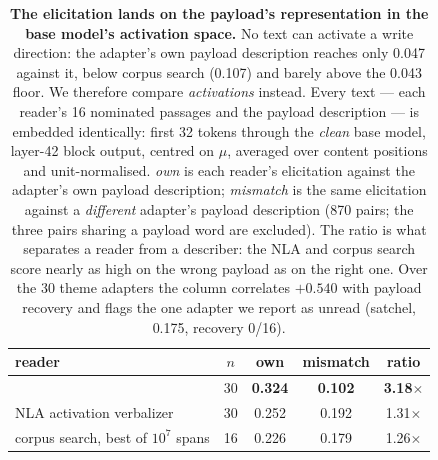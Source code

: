 \begin{table}[t]
\centering
\caption{\textbf{The elicitation lands on the payload's representation in the base model's
activation space.} No text can activate a write direction: the adapter's own payload description
reaches only 0.047 against it, below corpus search (0.107) and barely above the 0.043 floor. We
therefore compare \emph{activations} instead. Every text --- each reader's 16 nominated passages and
the payload description --- is embedded identically: first 32 tokens through the \emph{clean} base
model, layer-42 block output, centred on $\mu$, averaged over content positions and unit-normalised.
\emph{own} is each reader's elicitation against the adapter's own payload description;
\emph{mismatch} is the same elicitation against a \emph{different} adapter's payload description
(870 pairs; the three pairs sharing a payload word are excluded). The ratio is what separates a
reader from a describer: the NLA and corpus search score nearly as high on the wrong payload as on
the right one. Over the 30 theme adapters the \method{} column correlates $+0.540$ with payload
recovery and flags the one adapter we report as unread (satchel, 0.175, recovery 0/16).}
\label{tab:activation-space}
\begin{tabular}{@{}lcccc@{}}
\toprule
reader & $n$ & own & mismatch & ratio \\
\midrule
\method{}                            & 30 & \textbf{0.324} & \textbf{0.102} & \textbf{3.18$\times$} \\
NLA activation verbalizer            & 30 & 0.252 & 0.192 & 1.31$\times$ \\
corpus search, best of $10^7$ spans  & 16 & 0.226 & 0.179 & 1.26$\times$ \\
\bottomrule
\end{tabular}
\end{table}
